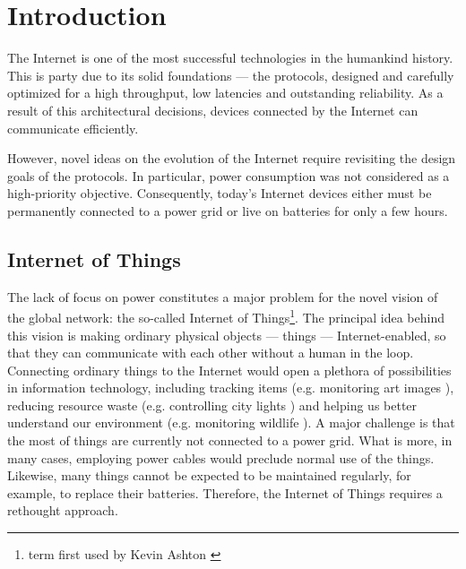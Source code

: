 \chapter{Introduction}

The Internet is one of the most successful technologies in the humankind history.
This is party due to its solid foundations --- the protocols, designed and carefully optimized for a high throughput, low latencies and outstanding reliability.
As a result of this architectural decisions, devices connected by the Internet can communicate efficiently.

However, novel ideas on the evolution of the Internet require revisiting the design goals of the protocols.
In particular, power consumption was not considered as a high-priority objective.
Consequently, today's Internet devices either must be permanently connected to a power grid or live on batteries for only a few hours.

\section{Internet of Things}

The lack of focus on power constitutes a major problem for the novel vision of the global network: the so-called Internet of Things\footnote{term first used by Kevin Ashton \cite{InternetOfThings}}.
The principal idea behind this vision is making ordinary physical objects --- things --- Internet-enabled, so that they can communicate with each other without a human in the loop.
Connecting ordinary things to the Internet would open a plethora of possibilities in information technology, including tracking items (e.g. monitoring art images \cite{GuArtNet}), reducing resource waste (e.g. controlling city lights \cite{singhvi2005intelligent}) and helping us better understand our environment (e.g. monitoring wildlife \cite{liu2009long}).
A major challenge is that the most of things are currently not connected to a power grid.
What is more, in many cases, employing power cables would preclude normal use of the things.
Likewise, many things cannot be expected to be maintained regularly, for example, to replace their batteries.
Therefore, the Internet of Things requires a rethought approach.


